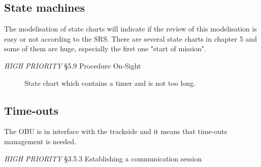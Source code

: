 \documentclass{template/openetcs_report}
\begin{document}
\subsection{State machines}
The modelisation of state charts will indicate if the review of this modelisation is easy or not according to the SRS. There are several state charts in chapter 5 and some of them are huge, especially the first one "start of mission".
\begin{description}
\item [\emph{HIGH PRIORITY} \S5.9 Procedure On-Sight] State chart which contains a timer and is not too long.
\end{description}

\subsection{Time-outs}
The OBU is in interface with the trackside and it means that time-outs management is needed.
\begin{description}
\item [\emph{HIGH PRIORITY} \S3.5.3 Establishing a communication session]
\end{description}
\end{document}
